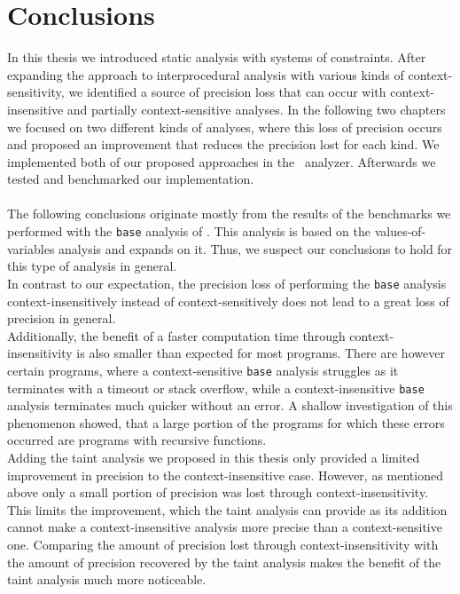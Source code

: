 
\chapter{Conclusions}\label{chapter:conclusions}
  In this thesis we introduced static analysis with systems of constraints. After expanding the approach to interprocedural analysis with various kinds of context-sensitivity, we identified a source of precision loss that can occur with context-insensitive and partially context-sensitive analyses. In the following two chapters we focused on two different kinds of analyses, where this loss of precision occurs and proposed an improvement that reduces the precision lost for each kind. We implemented both of our proposed approaches in the \gob\ analyzer. Afterwards we tested and benchmarked our implementation.\\
  \\
  The following conclusions originate mostly from the results of the benchmarks we performed with the \texttt{base} analysis of \gob. This analysis is based on the values-of-variables analysis and expands on it. Thus, we suspect our conclusions to hold for this type of analysis in general.\\
  In contrast to our expectation, the precision loss of performing the \texttt{base} analysis context-insensitively instead of context-sensitively does not lead to a great loss of precision in general.\\
  Additionally, the benefit of a faster computation time through context-insensitivity is also smaller than expected for most programs. There are however certain programs, where a context-sensitive \texttt{base} analysis struggles as it terminates with a timeout or stack overflow, while a context-insensitive \texttt{base} analysis terminates much quicker without an error. A shallow investigation of this phenomenon showed, that a large portion of the programs for which these errors occurred are programs with recursive functions.\\
  Adding the taint analysis we proposed in this thesis only provided a limited improvement in precision to the context-insensitive case. However, as mentioned above only a small portion of precision was lost through context-insensitivity. This limits the improvement, which the taint analysis can provide as its addition cannot make a context-insensitive analysis more precise than a context-sensitive one. Comparing the amount of precision lost through context-insensitivity with the amount of precision recovered by the taint analysis makes the benefit of the taint analysis much more noticeable.\\
